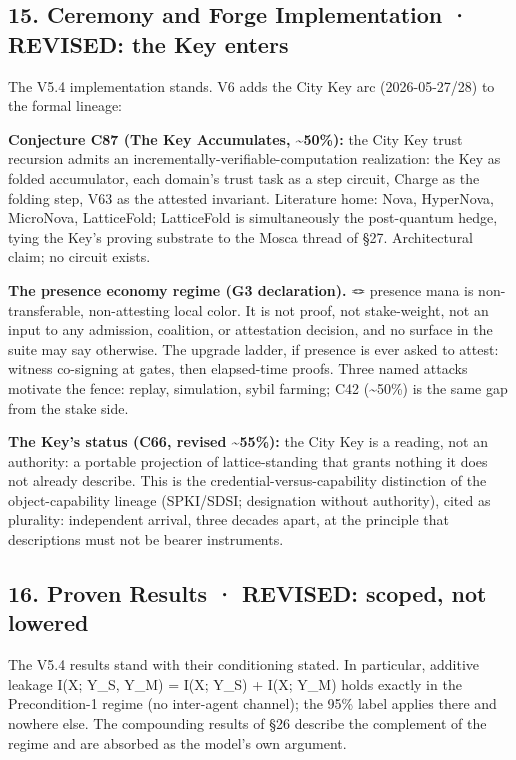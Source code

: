 \documentclass[
]{article}
\begin{document}
\subsection{15. Ceremony and Forge Implementation · REVISED: the Key
enters}\label{ceremony-and-forge-implementation-revised-the-key-enters}

The V5.4 implementation stands. V6 adds the City Key arc (2026-05-27/28)
to the formal lineage:

\textbf{Conjecture C87 (The Key Accumulates, \textasciitilde50\%):} the
City Key trust recursion admits an incrementally-verifiable-computation
realization: the Key as folded accumulator, each domain's trust task as
a step circuit, Charge as the folding step, V63 as the attested
invariant. Literature home: Nova, HyperNova, MicroNova, LatticeFold;
LatticeFold is simultaneously the post-quantum hedge, tying the Key's
proving substrate to the Mosca thread of §27. Architectural claim; no
circuit exists.

\textbf{The presence economy regime (G3 declaration).} 🪢 presence mana
is non-transferable, non-attesting local color. It is not proof, not
stake-weight, not an input to any admission, coalition, or attestation
decision, and no surface in the suite may say otherwise. The upgrade
ladder, if presence is ever asked to attest: witness co-signing at
gates, then elapsed-time proofs. Three named attacks motivate the fence:
replay, simulation, sybil farming; C42 (\textasciitilde50\%) is the same
gap from the stake side.

\textbf{The Key's status (C66, revised \textasciitilde55\%):} the City
Key is a reading, not an authority: a portable projection of
lattice-standing that grants nothing it does not already describe. This
is the credential-versus-capability distinction of the object-capability
lineage (SPKI/SDSI; designation without authority), cited as plurality:
independent arrival, three decades apart, at the principle that
descriptions must not be bearer instruments.

\subsection{16. Proven Results · REVISED: scoped, not
lowered}\label{proven-results-revised-scoped-not-lowered}

The V5.4 results stand with their conditioning stated. In particular,
additive leakage I(X; Y\_S, Y\_M) = I(X; Y\_S) + I(X; Y\_M) holds
exactly in the Precondition-1 regime (no inter-agent channel); the 95\%
label applies there and nowhere else. The compounding results of §26
describe the complement of the regime and are absorbed as the model's
own argument.
\end{document}

